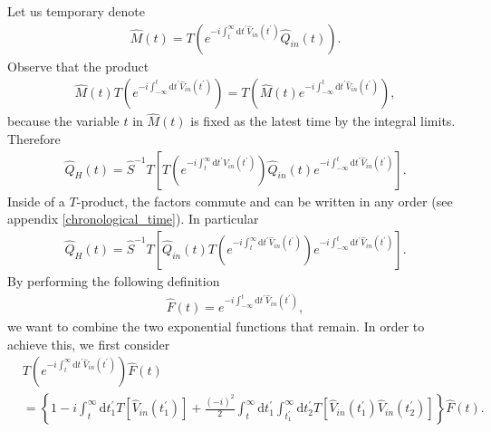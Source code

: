 \documentclass[12pt, titlepage]{article}
\begin{document}
Let us temporary denote 
\begin{equation}
\begin{split}
	\hat{M}(t) = T\left(
	e^{-i\int_{t}^{\infty}\mathrm{d}t^{\prime} \hat{V}_{in}(t^{\prime})}	
	\hat{Q}_{in}(t)	
	\right)
	.
\end{split}
\end{equation}
Observe that the product 
\begin{equation}
\begin{split}
	\hat{M}(t)
T
\left( 
 e^{-i\int_{-\infty}^{t}\mathrm{d}t^{\prime} \hat{V}_{in}(t^{\prime})}
\right)	
	 = 	
	 T
\left( 
\hat{M}(t)
 e^{-i\int_{-\infty}^{t}\mathrm{d}t^{\prime} \hat{V}_{in}(t^{\prime})}
\right) 
	,
\end{split}
\end{equation}
because the variable $ t $ in $ \hat{M}(t) $ is fixed as the latest time by the integral limits. Therefore 
\begin{equation}
\begin{split}
\hat{Q}_{H}(t)
=
\hat{S}^{-1} 
T
\left[ 
T
\left( 
 e^{-i\int_{t}^{\infty}\mathrm{d}t^{\prime} \hat{V}_{in}(t^{\prime})}
\right)
\hat{Q}_{in}(t)
 e^{-i\int_{-\infty}^{t}\mathrm{d}t^{\prime} \hat{V}_{in}(t^{\prime})}
\right] 
	.
\end{split}
\end{equation}
Inside of a $ T $-product, the factors commute and can be written in any order (see appendix \ref{chronological_time}). In particular 
\begin{equation}\label{GML_v0.3}
\begin{split}
\hat{Q}_{H}(t)
=
\hat{S}^{-1} 
T
\left[ 
\hat{Q}_{in}(t)
T
\left( 
 e^{-i\int_{t}^{\infty}\mathrm{d}t^{\prime} \hat{V}_{in}(t^{\prime})}
\right)
 e^{-i\int_{-\infty}^{t}\mathrm{d}t^{\prime} \hat{V}_{in}(t^{\prime})}
\right] 
	.
\end{split}
\end{equation} 
By performing the following definition 
\begin{equation}
\begin{split}
\hat{F}(t)
=
 e^{-i\int_{-\infty}^{t}\mathrm{d}t^{\prime} \hat{V}_{in}(t^{\prime})}
	,
\end{split}
\end{equation} 
we want to combine the two exponential functions that remain. In order to achieve this, we first consider
\begin{equation}
\begin{split}
& T
\left( 
 e^{-i\int_{t}^{\infty}\mathrm{d}t^{\prime} \hat{V}_{in}(t^{\prime})}
\right)
\hat{F}(t)
\\
&=
\left\lbrace 
1 
-
i
\int_{t}^{\infty}\mathrm{d}t^{\prime}_{1}
 T
 \left[ 
 \hat{V}_{in}(t^{\prime}_{1})
 \right] 
+
\frac{(-i)^{2}}{2}
\int_{t}^{\infty}\mathrm{d}t^{\prime}_{1}
\int_{t^{\prime}_{1}}^{\infty}\mathrm{d}t^{\prime}_{2}
 T
 \left[ 
 \hat{V}_{in}(t^{\prime}_{1})\hat{V}_{in}(t^{\prime}_{2})
 \right] 
\right\rbrace
\hat{F}(t)
.
\end{split}
\end{equation} 
\end{document}
